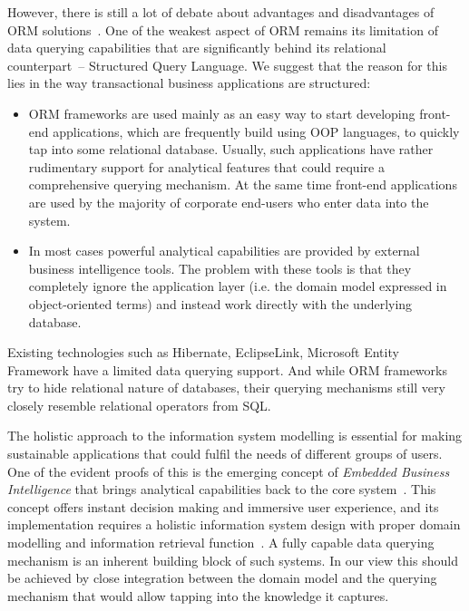   However, there is still a lot of debate about advantages and disadvantages of ORM solutions~\cite{Neward:2006:VCS, Fowler:2012:OH}.
  One of the weakest aspect of ORM remains its limitation of data querying capabilities that are significantly behind its relational counterpart~-- Structured Query Language.
  We suggest that the reason for this lies in the way transactional business applications are structured:
  \begin{itemize}
   \item ORM frameworks are used mainly as an easy way to start developing front-end applications, which are frequently build using OOP languages, to quickly tap into some relational database.
   Usually, such applications have rather rudimentary support for analytical features that could require a comprehensive querying mechanism. 
   At the same time front-end applications are used by the majority of corporate end-users who enter data into the system.
   \item In most cases powerful analytical capabilities are provided by external business intelligence tools.
   The problem with these tools is that they completely ignore the application layer (i.e. the domain model expressed in object-oriented terms) and instead work directly with the underlying database.
  \end{itemize}
  Existing technologies such as Hibernate, EclipseLink, Microsoft Entity Framework have a limited data querying support.
  And while ORM frameworks try to hide relational nature of databases, their querying mechanisms still very closely resemble relational operators from SQL.
  
  The holistic approach to the information system modelling is essential for making sustainable applications that could fulfil the needs of different groups of users.
  One of the evident proofs of this is the emerging concept of \emph{Embedded Business Intelligence} that brings analytical capabilities back to the core system~\cite{XuLiShiHeWang:2007}.
  This concept offers instant decision making and immersive user experience, and its implementation requires a holistic information system design with proper domain modelling and information retrieval function~\cite{oli2007}.
  A fully capable data querying mechanism is an inherent building block of such systems.
  In our view this should be achieved by close integration between the domain model and the querying mechanism that would allow tapping into the knowledge it captures.

